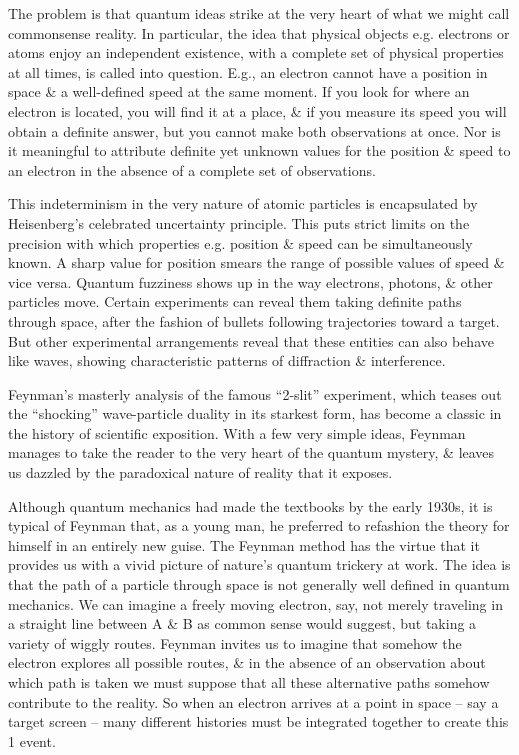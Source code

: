 \documentclass{article}
\begin{document}
The problem is that quantum ideas strike at the very heart of what we might call commonsense reality. In particular, the idea that physical objects e.g. electrons or atoms enjoy an independent existence, with a complete set of physical properties at all times, is called into question. E.g., an electron cannot have a position in space \& a well-defined speed at the same moment. If you look for where an electron is located, you will find it at a place, \& if you measure its speed you will obtain a definite answer, but you cannot make both observations at once. Nor is it meaningful to attribute definite yet unknown values for the position \& speed to an electron in the absence of a complete set of observations.

This indeterminism in the very nature of atomic particles is encapsulated by {\sc Heisenberg}'s celebrated uncertainty principle. This puts strict limits on the precision with which properties e.g. position \& speed can be simultaneously known. A sharp value for position smears the range of possible values of speed \& vice versa. Quantum fuzziness shows up in the way electrons, photons, \& other particles move. Certain experiments can reveal them taking definite paths through space, after the fashion of bullets following trajectories toward a target. But other experimental arrangements reveal that these entities can also behave like waves, showing characteristic patterns of diffraction \& interference.

{\sc Feynman}'s masterly analysis of the famous ``2-slit'' experiment, which teases out the ``shocking'' wave-particle duality in its starkest form, has become a classic in the history of scientific exposition. With a few very simple ideas, {\sc Feynman} manages  to take the reader to the very heart of the quantum mystery, \& leaves us dazzled by the paradoxical nature of reality that it exposes.

Although quantum mechanics had made the textbooks by the early 1930s, it is typical of {\sc Feynman} that, as a young man, he preferred to refashion the theory for himself in an entirely new guise. The {\sc Feynman} method has the virtue that it provides us with a vivid picture of nature's quantum trickery at work. The idea is that the path of a particle through space is not generally well defined in quantum mechanics. We can imagine a freely moving electron, say, not merely traveling in a straight line between A \& B as common sense would suggest, but taking a variety of wiggly routes. {\sc Feynman} invites us to imagine that somehow the electron explores all possible routes, \& in the absence of an observation about which path is taken we must suppose that all these alternative paths somehow contribute to the reality. So when an electron arrives at a point in space -- say a target screen -- many different histories must be integrated together to create this 1 event.
\end{document}

